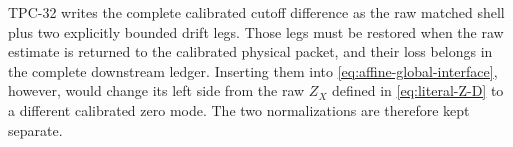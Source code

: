 \begin{remark}
\label{rem:affine-drift-downstream}
TPC-32 writes the complete calibrated cutoff difference as the raw
matched shell plus two explicitly bounded drift legs.  Those legs
must be restored when the raw estimate is returned to the calibrated
physical packet, and their loss belongs in the complete downstream
ledger.  Inserting them into
\eqref{eq:affine-global-interface}, however, would change its left
side from the raw \(Z_X\) defined in \eqref{eq:literal-Z-D} to a
different calibrated zero mode.  The two normalizations are therefore
kept separate.
\end{remark}

